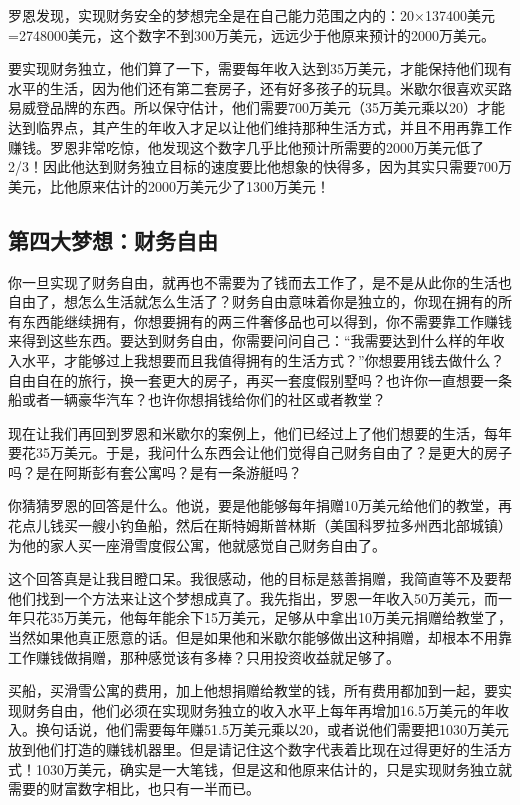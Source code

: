 罗恩发现，实现财务安全的梦想完全是在自己能力范围之内的：20×137400美元=2748000美元，这个数字不到300万美元，远远少于他原来预计的2000万美元。

要实现财务独立，他们算了一下，需要每年收入达到35万美元，才能保持他们现有水平的生活，因为他们还有第二套房子，还有好多孩子的玩具。米歇尔很喜欢买路易威登品牌的东西。所以保守估计，他们需要700万美元（35万美元乘以20）才能达到临界点，其产生的年收入才足以让他们维持那种生活方式，并且不用再靠工作赚钱。罗恩非常吃惊，他发现这个数字几乎比他预计所需要的2000万美元低了2/3！因此他达到财务独立目标的速度要比他想象的快得多，因为其实只需要700万美元，比他原来估计的2000万美元少了1300万美元！

\subsection{第四大梦想：财务自由}

你一旦实现了财务自由，就再也不需要为了钱而去工作了，是不是从此你的生活也自由了，想怎么生活就怎么生活了？财务自由意味着你是独立的，你现在拥有的所有东西能继续拥有，你想要拥有的两三件奢侈品也可以得到，你不需要靠工作赚钱来得到这些东西。要达到财务自由，你需要问问自己：“我需要达到什么样的年收入水平，才能够过上我想要而且我值得拥有的生活方式？”你想要用钱去做什么？自由自在的旅行，换一套更大的房子，再买一套度假别墅吗？也许你一直想要一条船或者一辆豪华汽车？也许你想捐钱给你们的社区或者教堂？

现在让我们再回到罗恩和米歇尔的案例上，他们已经过上了他们想要的生活，每年要花35万美元。于是，我问什么东西会让他们觉得自己财务自由了？是更大的房子吗？是在阿斯彭有套公寓吗？是有一条游艇吗？

你猜猜罗恩的回答是什么。他说，要是他能够每年捐赠10万美元给他们的教堂，再花点儿钱买一艘小钓鱼船，然后在斯特姆斯普林斯（美国科罗拉多州西北部城镇）为他的家人买一座滑雪度假公寓，他就感觉自己财务自由了。

这个回答真是让我目瞪口呆。我很感动，他的目标是慈善捐赠，我简直等不及要帮他们找到一个方法来让这个梦想成真了。我先指出，罗恩一年收入50万美元，而一年只花35万美元，他每年能余下15万美元，足够从中拿出10万美元捐赠给教堂了，当然如果他真正愿意的话。但是如果他和米歇尔能够做出这种捐赠，却根本不用靠工作赚钱做捐赠，那种感觉该有多棒？只用投资收益就足够了。

买船，买滑雪公寓的费用，加上他想捐赠给教堂的钱，所有费用都加到一起，要实现财务自由，他们必须在实现财务独立的收入水平上每年再增加16.5万美元的年收入。换句话说，他们需要每年赚51.5万美元乘以20，或者说他们需要把1030万美元放到他们打造的赚钱机器里。但是请记住这个数字代表着比现在过得更好的生活方式！1030万美元，确实是一大笔钱，但是这和他原来估计的，只是实现财务独立就需要的财富数字相比，也只有一半而已。

